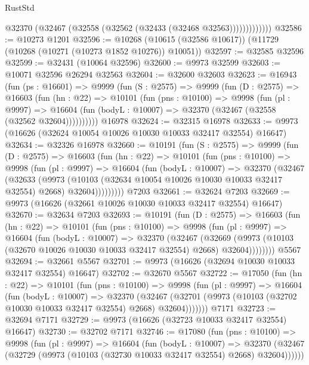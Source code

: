 \begin{lexlean}{RustStd}
\begin{coremodule}
                  @32370 (@32467 (@32558 (@32562 (@32433 (@32468 @32563)))))))))))))
@32586 := @10273 @1201
@32596 := @10268 (@10615 (@32586 @10617)) (@11729 (@10268 (@10271 (@10273 @1852 @10276)) @10051))
@32597 := @32585 @32596
@32599 := @32431 (@10064 @32596)
@32600 := @9973 @32599
@32603 := @10071 @32596 @26294 @32563
@32604 := @32600 @32603
@32623 := @16943
    (fun (ps : @16601) =>
    @9999
      (fun (S : @2575) =>
      @9999
        (fun (D : @2575) =>
        @16603
          (fun (hn : @22) =>
          @10101
            (fun (pns : @10100) =>
            @9998
              (fun (pl : @9997) =>
              @16604 (fun (bodyL : @10007) => @32370 (@32467 (@32558 (@32562 @32604))))))))))
    @16978
@32624 := @32315 @16978
@32633 := @9973 (@16626 (@32624 @10054 @10026 @10030 @10033 @32417 @32554) @16647)
@32634 := @32326 @16978
@32660 := @10191
    (fun (S : @2575) =>
    @9999
      (fun (D : @2575) =>
      @16603
        (fun (hn : @22) =>
        @10101
          (fun (pns : @10100) =>
          @9998
            (fun (pl : @9997) =>
            @16604
              (fun (bodyL : @10007) =>
              @32370
                (@32467
                  (@32633
                    (@9973
                      (@10103 (@32634 @10054 @10026 @10030 @10033 @32417 @32554) @2668)
                      @32604)))))))))
    @7203
@32661 := @32624 @7203
@32669 := @9973 (@16626 (@32661 @10026 @10030 @10033 @32417 @32554) @16647)
@32670 := @32634 @7203
@32693 := @10191
    (fun (D : @2575) =>
    @16603
      (fun (hn : @22) =>
      @10101
        (fun (pns : @10100) =>
        @9998
          (fun (pl : @9997) =>
          @16604
            (fun (bodyL : @10007) =>
            @32370
              (@32467
                (@32669
                  (@9973 (@10103 (@32670 @10026 @10030 @10033 @32417 @32554) @2668) @32604))))))))
    @5567
@32694 := @32661 @5567
@32701 := @9973 (@16626 (@32694 @10030 @10033 @32417 @32554) @16647)
@32702 := @32670 @5567
@32722 := @17050
    (fun (hn : @22) =>
    @10101
      (fun (pns : @10100) =>
      @9998
        (fun (pl : @9997) =>
        @16604
          (fun (bodyL : @10007) =>
          @32370
            (@32467 (@32701 (@9973 (@10103 (@32702 @10030 @10033 @32417 @32554) @2668) @32604)))))))
    @7171
@32723 := @32694 @7171
@32729 := @9973 (@16626 (@32723 @10033 @32417 @32554) @16647)
@32730 := @32702 @7171
@32746 := @17080
    (fun (pns : @10100) =>
    @9998
      (fun (pl : @9997) =>
      @16604
        (fun (bodyL : @10007) =>
        @32370 (@32467 (@32729 (@9973 (@10103 (@32730 @10033 @32417 @32554) @2668) @32604))))))

\end{coremodule}
\end{lexlean}
